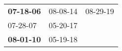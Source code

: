 \begin{supertabular}{p{0.33\columnwidth}p{0.33\columnwidth}p{0.33\columnwidth}}
 \textbf{07-18-06\textsuperscript{}} &  08-08-14\textsuperscript{} &  08-29-19\textsuperscript{} \\
          07-28-07\textsuperscript{} &  05-20-17\textsuperscript{} &                             \\
 \textbf{08-01-10\textsuperscript{}} &  05-19-18\textsuperscript{} &                             \\
\end{supertabular}

